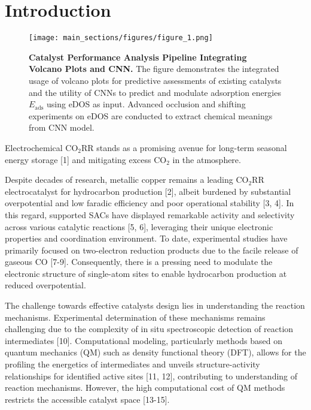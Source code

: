 

\section{Introduction}

\begin{figure}
    \centering
    \texttt{[image: main\_sections/figures/figure\_1.png]}
    \caption{\textbf{Catalyst Performance Analysis Pipeline Integrating Volcano Plots and CNN.}
    The figure demonstrates the integrated usage of volcano plots for predictive assessments of existing catalysts and the utility of CNNs to predict and modulate adsorption energies \(E_{\text{ads}}\) using eDOS as input.
    Advanced occlusion and shifting experiments on eDOS are conducted to extract chemical meanings from CNN model.}
    \label{main_fig1:pipeline}
\end{figure}

Electrochemical CO$_2$RR stands as a promising avenue for long-term seasonal energy storage [1] and mitigating excess CO$_2$ in the atmosphere.

Despite decades of research, metallic copper remains a leading CO$_2$RR electrocatalyst for hydrocarbon production [2], albeit burdened by substantial overpotential and low faradic efficiency and poor operational stability [3, 4].
In this regard, supported SACs have displayed remarkable activity and selectivity across various catalytic reactions [5, 6], leveraging their unique electronic properties and coordination environment.
To date, experimental studies have primarily focused on two-electron reduction products due to the facile release of gaseous CO [7-9].
Consequently, there is a pressing need to modulate the electronic structure of single-atom sites to enable hydrocarbon production at reduced overpotential.

The challenge towards effective catalysts design lies in understanding the reaction mechanisms.
Experimental determination of these mechanisms remains challenging due to the complexity of in situ spectroscopic detection of reaction intermediates [10].
Computational modeling, particularly methods based on quantum mechanics (QM) such as density functional theory (DFT),
allows for the profiling the energetics of intermediates and unveils structure-activity relationships for identified active sites [11, 12], contributing to understanding of reaction mechanisms.
However, the high computational cost of QM methods restricts the accessible catalyst space [13-15].

